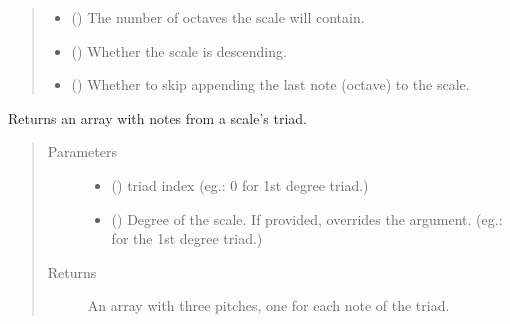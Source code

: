 \documentclass[letterpaper,10pt,english]{sphinxmanual}
\begin{document}
\begin{fulllineitems}
\begin{fulllineitems}
\begin{quote}
\begin{description}
\begin{itemize}
\item {} 
 () \textendash{} The number of octaves the scale will contain.

\item {} 
 () \textendash{} Whether the scale is descending.

\item {} 
 () \textendash{} Whether to skip appending the last
note (octave) to the scale.

\end{itemize}

\end{description}\end{quote}

\end{fulllineitems}


\begin{fulllineitems}
\label{\detokenize{index:birdears.scale.DiatonicScale.get_triad}}
Returns an array with notes from a scale’s triad.
\begin{quote}\begin{description}
\item[{Parameters}] \leavevmode\begin{itemize}
\item {} 
 () \textendash{} triad index (eg.: 0 for 1st degree triad.)

\item {} 
 () \textendash{} Degree of the scale. If provided, overrides the
 argument. (eg.:  for the 1st degree triad.)

\end{itemize}

\item[{Returns}] \leavevmode
An array with three pitches, one for each note of the triad.

\end{description}\end{quote}

\end{fulllineitems}


\end{fulllineitems}
\end{document}
